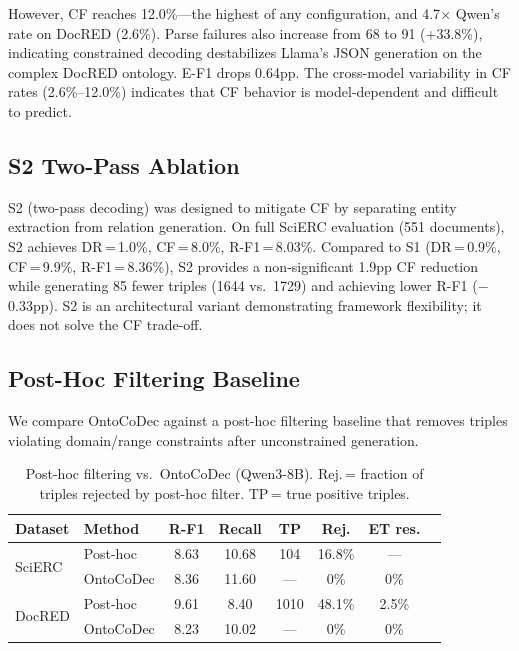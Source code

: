 \documentclass[11pt,a4paper]{article}
\newcommand{\method}{OntoCoDec}
\begin{document}
However, CF reaches 12.0\%---the highest of any configuration, and 4.7$\times$ Qwen's rate on DocRED (2.6\%). Parse failures also increase from 68 to 91 (+33.8\%), indicating constrained decoding destabilizes Llama's JSON generation on the complex DocRED ontology. E-F1 drops 0.64pp. The cross-model variability in CF rates (2.6\%--12.0\%) indicates that CF behavior is model-dependent and difficult to predict.

\subsection{S2 Two-Pass Ablation}
\label{sec:s2_ablation}

S2 (two-pass decoding) was designed to mitigate CF by separating entity extraction from relation generation. On full SciERC evaluation (551 documents), S2 achieves DR\,=\,1.0\%, CF\,=\,8.0\%, R-F1\,=\,8.03\%. Compared to S1 (DR\,=\,0.9\%, CF\,=\,9.9\%, R-F1\,=\,8.36\%), S2 provides a non-significant 1.9pp CF reduction while generating 85 fewer triples (1644 vs.\ 1729) and achieving lower R-F1 ($-$0.33pp). S2 is an architectural variant demonstrating framework flexibility; it does not solve the CF trade-off.

\subsection{Post-Hoc Filtering Baseline}
\label{sec:posthoc}

We compare \method{} against a post-hoc filtering baseline that removes triples violating domain/range constraints after unconstrained generation.

\begin{table}[t]
\centering
\small
\caption{Post-hoc filtering vs.\ \method{} (Qwen3-8B). Rej.\,= fraction of triples rejected by post-hoc filter. TP\,= true positive triples.}
\label{tab:posthoc}
\begin{tabular}{llcccccc}
\toprule
\textbf{Dataset} & \textbf{Method} & \textbf{R-F1} & \textbf{Recall} & \textbf{TP} & \textbf{Rej.} & \textbf{ET res.} \\
\midrule
\multirow{2}{*}{SciERC}
    & Post-hoc   & 8.63 & 10.68 & 104 & 16.8\% & --- \\
    & \method{}  & 8.36 & 11.60 & --- & 0\%    & 0\% \\
\midrule
\multirow{2}{*}{DocRED}
    & Post-hoc   & 9.61 & 8.40  & 1010 & 48.1\% & 2.5\% \\
    & \method{}  & 8.23 & 10.02 & ---  & 0\%    & 0\% \\
\bottomrule
\end{tabular}
\end{table}
\end{document}
